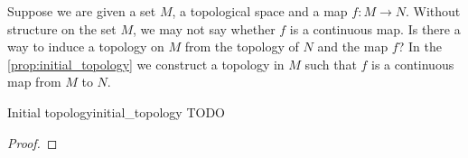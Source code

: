 Suppose we are given a set \(M\), a topological space  and a map \(f : M \to N\). Without structure on the set \(M\), we may not say whether \(f\) is a continuous map. Is there a way to induce a topology on \(M\) from the topology of \(N\) and the map \(f\)? In the \cref{prop:initial_topology} we construct a topology in \(M\) such that \(f\) is a continuous map from \(M\) to \(N\).

\begin{proposition}{Initial topology}{initial_topology}
    TODO
\end{proposition}
\begin{proof}
\end{proof}

